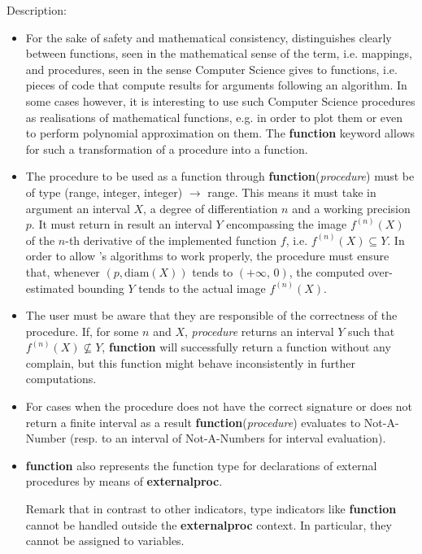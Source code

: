 \noindent Description: \begin{itemize}

\item For the sake of safety and mathematical consistency, \sollya
   distinguishes clearly between functions, seen in the mathematical
   sense of the term, i.e. mappings, and procedures, seen in the sense
   Computer Science gives to functions, i.e. pieces of code that compute
   results for arguments following an algorithm. In some cases however,
   it is interesting to use such Computer Science procedures as
   realisations of mathematical functions, e.g. in order to plot them or
   even to perform polynomial approximation on them. The \textbf{function} keyword
   allows for such a transformation of a \sollya procedure into a \sollya
   function. 

\item The procedure to be used as a function through \textbf{function}(\emph{procedure})
   must be of type (\textsf{range}, \textsf{integer}, \textsf{integer})
   $\rightarrow$ \textsf{range}. This means it must take in argument
   an interval $X$, a degree of differentiation $n$ and a
   working precision $p$. It must return in result an interval
   $Y$ encompassing the image $f^{(n)}(X)$ of the
   $n$-th derivative of the implemented function $f$,
   i.e. $f^{(n)}(X) \subseteq Y$. In order to allow
   \sollya's algorithms to work properly, the procedure must ensure that,
   whenever $(p, \textrm{diam}(X))$ tends to $(+\infty,\,0)$,
   the computed over-estimated bounding $Y$ tends to the actual image $f^{(n)}(X)$.

\item The user must be aware that they are responsible of the correctness
   of the procedure. If, for some $n$ and $X$, \emph{procedure} returns an interval $Y$
   such that $f^{(n)}(X) \not\subseteq Y$, \textbf{function} will successfully
   return a function without any complain, but this function might behave
   inconsistently in further computations.

\item For cases when the procedure does not have the correct signature or
   does not return a finite interval as a result \textbf{function}(\emph{procedure})
   evaluates to Not-A-Number (resp. to an interval of Not-A-Numbers for
   interval evaluation).

\item \textbf{function} also represents the \textsf{function} type for declarations
   of external procedures by means of \textbf{externalproc}.
    
   Remark that in contrast to other indicators, type indicators like
   \textbf{function} cannot be handled outside the \textbf{externalproc} context.  In
   particular, they cannot be assigned to variables.
\end{itemize}

